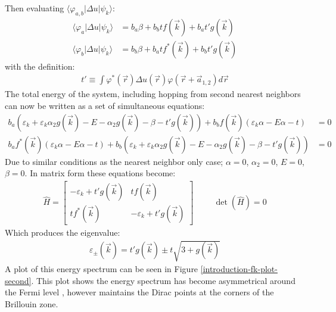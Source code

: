 			Then evaluating $\langle\varphi_{a,b}|\Delta u|\psi_{k}\rangle$:
			\begin{align}
				\langle\varphi_{a}|\Delta u|\psi_{k}\rangle&=b_{a}\beta+b_{b}tf\left(\vec{k}\right)+b_{a}t'g\left(\vec{k}\right)\\
				\langle\varphi_{b}|\Delta u|\psi_{k}\rangle&=b_{b}\beta+b_{a}tf^{*}\left(\vec{k}\right)+b_{b}t'g\left(\vec{k}\right)
			\end{align}
			with the definition:
			\begin{align}
				t'\equiv\int\varphi^{*}\left(\vec{r}\right)\Delta u\left(\vec{r}\right)\varphi\left(\vec{r}+\vec{a}_{1,2}\right) d\vec{r}
			\end{align}
			The total energy of the system, including hopping from second nearest neighbors can now be written as a set of simultaneous equations:
			\begin{align}
				b_{a}\left(\varepsilon_{k}+\varepsilon_{k}\alpha_{2}g\left(\vec{k}\right)-E-\alpha_{2}g\left(\vec{k}\right)-\beta-t'g\left(\vec{k}\right)\right)+b_{b}f\left(\vec{k}\right)\left(\varepsilon_{k}\alpha-E\alpha-t\right)&=0\\
				b_{a}f^{*}\left(\vec{k}\right)\left(\varepsilon_{k}\alpha-E\alpha-t\right)+b_{b}\left(\varepsilon_{k}+\varepsilon_{k}\alpha_{2}g\left(\vec{k}\right)-E-\alpha_{2}g\left(\vec{k}\right)-\beta-t'g\left(\vec{k}\right)\right)&=0
			\end{align}
			Due to similar conditions as the nearest neighbor only case; $\alpha=0$, $\alpha_{2}=0$, $E=0$, $\beta=0$. In matrix form these equations become:
			\begin{align}
				\hat{H}=\left[\begin{array}{ccc}
					-\varepsilon_{k}+t'g\left(\vec{k}\right)&t f\left(\vec{k}\right)\\
					t f^{*}\left(\vec{k}\right)&-\varepsilon_{k}+t'g\left(\vec{k}\right)
				\end{array}\right]\hspace{1cm}\det\left(\hat{H}\right)=0
			\end{align}
			Which produces the eigenvalue:
			\begin{align}
				\varepsilon_{\pm}\left(\vec{k}\right)=t'g\left(\vec{k}\right)\pm t\sqrt{3+g\left(\vec{k}\right)}
				\label{fk-second}
			\end{align}
			A plot of this energy spectrum can be seen in Figure \ref{introduction-fk-plot-second}. This plot shows the energy spectrum has become asymmetrical around the Fermi level \cite{b1}, however maintains the Dirac points at the corners of the Brillouin zone.
